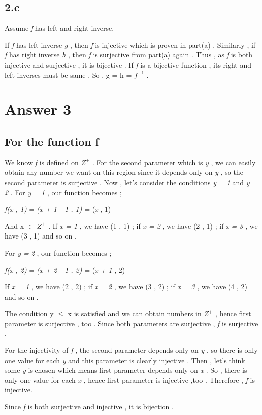 \documentclass[12pt]{article}
\begin{document}
\subsection*{2.c}
\hspace{13px} Assume \textit{f} has left and right inverse. \par   If \textit{f} has left inverse \textit{g} , then \textit{f} is injective which is proven in part(a) . Similarly , if \textit{f} has right inverse \textit{h} , then \textit{f} is surjective from part(a) again . Thus , as \textit{f} is both injective and surjective , it is bijective . If \textit{f} is a bijective function , its right and left inverses must be same . So , g = h = \textit{$f^{-1}$} . 
\section*{Answer 3}
\subsection*{For the function f}
\hspace{15px} We know \textit{f} is defined on \textit{$Z^{+}$} . For the second parameter which is \textit{y} , we can easily obtain any number we want on this region since it depends only on \textit{y} , so the second parameter is surjective . Now , let's consider the conditions \textit{y = 1} and \textit{y = 2} . For \textit{y = 1} , our function becomes ; \par  \textit{f(x , 1)} = \textit{(x + 1 - 1 , 1)} = (\textit{x} , 1) \par 
And x $\in$ \textit{$Z^{+}$} . If \textit{x = 1} , we have (1 , 1) ; if \textit{x = 2} , we have (2 , 1) ; if \textit{x = 3} , we have (3 , 1) and so on . \par 
For \textit{y = 2} , our function becomes ; \par 
\textit{f(x , 2)} = \textit{(x + 2 - 1 , 2)} = (\textit{x + 1} , 2) \par If \textit{x = 1} , we have (2 , 2) ; if \textit{x = 2} , we have (3 , 2) ; if \textit{x = 3} , we have (4 , 2) and so on . \par The condition y $\leq$ x is satisfied and we can obtain numbers in \textit{$Z^{+}$} , hence first parameter is surjective , too . Since both parameters are surjective , \textit{f} is surjective . \par 
For the injectivity of \textit{f} , the second parameter depends only on \textit{y} , so there is only one value for each \textit{y} and this parameter is clearly injective . Then , let's think some \textit{y} is chosen which means first parameter depends only on \textit{x} . So , there is only one value for each \textit{x} , hence first parameter is injective ,too . Therefore , \textit{f} is injective. \par 
Since \textit{f} is both surjective and injective , it is bijection .
\end{document}
